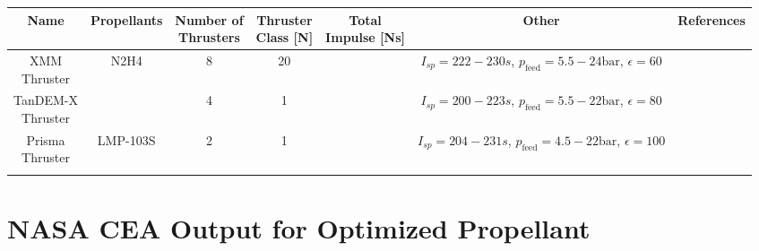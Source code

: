 \documentclass[12pt]{article}
\begin{document}
\newpage
\begin{adjustbox}{angle=90, center,caption={Overview of small propulsion systems using monopropellants.}}%
	\begin{tabular}{|c|c|c|c|c|c|c|}
		\hline
		Name & Propellants & \makecell{Number of\\Thrusters} & \makecell{Thruster\\Class {[}N{]}} & \makecell{Total\\Impulse [Ns]} & Other & References\\ \hline
		
		\makecell{XMM\\Thruster} & N2H4 & 8 & 20 & \makecell{$>517000$}  & \makecell{$I_{sp}=222-230s$,\\$p_{\text{feed}}=5.5-24\text{bar}$,\\$\epsilon=60$} & \makecell{ \cite{EsaXMM} \cite{ariane20N}} \\ \hline
		
		\makecell{TanDEM-X\\Thruster} & \makecell{N2H4} & 4 & 1 & \makecell{$>135000$}& \makecell{$I_{sp}=200-223s$,\\$p_{\text{feed}}=5.5-22\text{bar}$,\\$\epsilon=80$\\} & \makecell{\cite{tandemX} \cite{ariane1N}}\\ \hline
		
		\makecell{Prisma\\Thruster}& LMP-103S & 2 & 1 & \makecell{$\approx 108773$} & \makecell{$I_{sp}=204-231s$,\\$p_{\text{feed}}=4.5-22\text{bar}$,\\$\epsilon=100$} & \cite{hpgpThruster} \\ \hline
		\label{tab:reference}
	\end{tabular}
\end{adjustbox}

\newpage
\section{NASA CEA Output for Optimized Propellant}
\label{chap:cea_output}


\newpage
\printbibliography 
 
\end{document}
